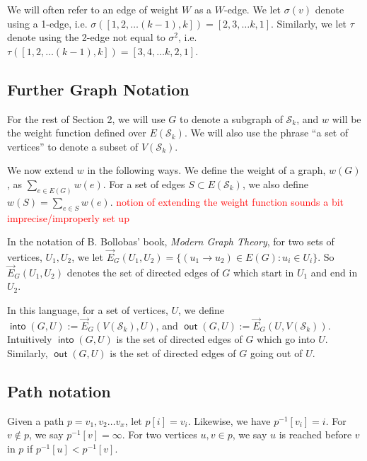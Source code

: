 \documentclass{article}
\theoremstyle{definition}
\DeclareMathOperator{\out}{\bm{\mathsf{out}}}
\DeclareMathOperator{\into}{\bm{\mathsf{into}}}
\newcommand{\hide}[1]{}
\newcommand{\edit}[1]{\textcolor{red}{#1}}
\begin{document}
We will often refer to an edge of weight $W$ as a $W$-edge. We let $\sigma(v)$ denote using a 1-edge, i.e. $\sigma([1,2,\dots (k-1), k]) = [2,3,\dots k,1]$. Similarly, we let $\tau$ denote using the 2-edge not equal to $\sigma^2$, i.e. $\tau([1,2,\dots (k-1), k]) = [3,4,\dots k,2,1]$.

\subsection{Further Graph Notation}

For the rest of Section 2, we will use $G$ to denote a subgraph of $\mathcal{S}_k$, and $w$ will be the weight function defined over $E(\mathcal{S}_k)$. We will also use the phrase ``a set of vertices'' to denote a subset of $V(\mathcal{S}_k)$.

We now extend $w$ in the following ways. We define the weight of a graph, $w(G)$, as $\sum_{e \in E(G)} w(e)$. For a set of edges $S \subset E(\mathcal{S}_k)$, we also define $w(S) = \sum_{e \in S} w(e)$. \edit{notion of extending the weight function sounds a bit imprecise/improperly set up}

\vspace{1.75em}

In the notation of B. Bollobas' book, \textit{Modern Graph Theory}, for two sets of vertices, $U_1,U_2$, we let $\vec{E}_G(U_1,U_2) = \{(u_1\to u_2)\in E(G):u_i\in U_i\}$. So $\vec{E}_G(U_1,U_2)$ denotes the set of directed edges of $G$ which start in $U_1$ and end in $U_2$. 

In this language, for a set of vertices, $U$, we define $\into(G,U) := \vec{E}_G(V(\mathcal{S}_k),U)$, and $\out(G,U):=\vec{E}_G(U,V(\mathcal{S}_k))$. Intuitively $\into(G,U)$ is the set of directed edges of $G$ which go into $U$. Similarly, $\out(G,U)$ is the set of directed edges of $G$ going out of $U$. 

\hide{\edit{Professor Green said I shouldn't use non-standard notation, so I intend to deprecate the usage of $\into$ and $\out$. Haven't gotten around to it yet, as I want to figure out to avoid the notation being too cluttered, since specifying $G$ will be necessary. Update: his grad student thought this notation was fine.}}


\subsection{Path notation}

Given a path $p = v_1,v_2 \dots v_x$, let $p[i] = v_i$. Likewise, we have $p^{-1}[v_i] =i$. For $v \not \in p$, we say $p^{-1}[v] = \infty$. For two vertices $u,v \in p$, we say $u$ is reached before $v$ in $p$ if $p^{-1}[u]<p^{-1}[v]$. 
\end{document}

